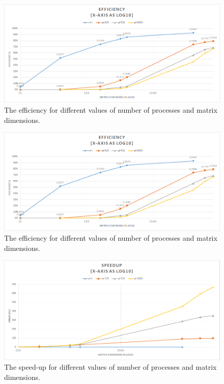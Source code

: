 \documentclass[a4paper,11pt,oneside]{book}
\begin{document}
\begin{figure}[H]
  \centering
  \includegraphics[width=0.9\linewidth]{plots-eff1.png}
  \caption{The efficiency for different values of number of processes and matrix dimensions.}
  \centering
  \label{fig:sub1}
\end{figure}
\begin{figure}[H]
  \centering
  \includegraphics[width=0.9\linewidth]{plots-eff1.png}
  \caption{The efficiency for different values of number of processes and matrix dimensions.}
  \centering
  \label{fig:sub1}
\end{figure}
\begin{figure}[H]
  \centering
  \includegraphics[width=0.9\linewidth]{plots-speedup.png}
  \caption{The speed-up for different values of number of processes and matrix dimensions.}
  \centering
  \label{fig:sub1}
\end{figure}
\end{document}

